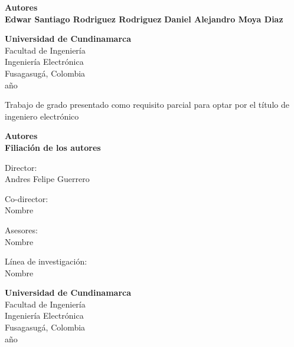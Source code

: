 \thispagestyle{empty}
\begin{center}
	\textbf{\fontsize{20}{0}{\selectfont{Evaluación del comportamiento de sistemas de almacenamiento por baterías bajo la influencia de fenómenos de calidad de la potencia en la red eléctrica}}}
	
	\vspace{7.8cm}
	
	\textbf{Autores}\\
	\textbf{Edwar Santiago Rodriguez Rodriguez}
	\newline
	\textbf{Daniel Alejandro Moya Diaz}

	
	\vspace{7.5cm}
	
	\textbf{Universidad de Cundinamarca}\\
	Facultad de Ingeniería\\
	Ingeniería Electrónica\\
	Fusagasugá, Colombia\\
	año
\end{center}
\newpage
\thispagestyle{empty}
\begin{center}
	\textbf{\fontsize{20}{0}{\selectfont{Evaluación del comportamiento de sistemas de almacenamiento por baterías bajo la influencia de fenómenos de calidad de la potencia en la red eléctrica}}}
	
	\vspace{1.82cm}
	
	Trabajo de grado presentado como requisito parcial para optar por el título de ingeniero electrónico
	
	\vspace{1.0cm}
	
	\textbf{Autores}\\
	\textbf{Filiación de los autores}
	
	\vspace{1.0cm}
	
	Director:\\
	Andres Felipe Guerrero
	
	\vspace{1.5cm}	
	
	Co-director:\\
	Nombre
	
	\vspace{1.5cm}	
	
	Asesores:\\
	Nombre
	
	\vspace{1.5cm}	
	
	Línea de investigación:\\
	Nombre
	
	\vspace{1.5cm}
	
	\textbf{Universidad de Cundinamarca}\\
	Facultad de Ingeniería\\
	Ingeniería Electrónica\\
	Fusagasugá, Colombia\\
	año
\end{center}
\newpage	